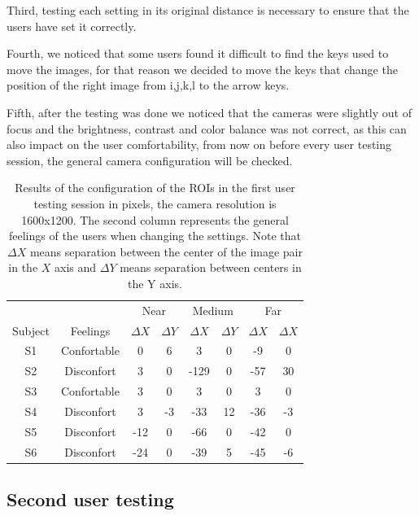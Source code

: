 \documentclass[10pt,a4paper,twocolumn,twoside]{article}
\begin{document}
	Third, testing each setting in its original distance is necessary to ensure that the users have set it correctly.
	
	Fourth, we noticed that some users found it difficult to find the keys used to move the images, for that reason we decided to move the keys that change the position of the right image from i,j,k,l to the arrow keys. 
	
	Fifth, after the testing was done we noticed that the cameras were slightly out of focus and the brightness, contrast and color balance was not correct, as this can also impact on the user comfortability, from now on before every user testing session, the general camera configuration will be checked.
	
	
	\begin{table}
		\begin{center}
			\begin{tabular}{cccccccc}
				\toprule
				& & \multicolumn{2}{c}{Near} & \multicolumn{2}{c}{Medium} & \multicolumn{2}{c}{Far} \\ 
				Subject &Feelings & $\Delta X$ & $\Delta Y$ & $\Delta X$ & $\Delta Y$ & $\Delta X$ & $\Delta X$ \\ 
				\midrule
				S1&Confortable & 0 & 6 & 3 & 0 & -9 & 0 \\ 
				\midrule 
				S2&Disconfort & 3 & 0 & -129 & 0 & -57 & 30 \\ 
				\midrule
				S3&Confortable & 3 & 0 & 3 & 0 & 3 & 0 \\ 
				\midrule 
				S4&Disconfort & 3 & -3 & -33 & 12 & -36 & -3 \\ 
				\midrule
				S5&Disconfort & -12 & 0 & -66 & 0 & -42 & 0 \\ 
				\midrule
				S6&Disconfort & -24 & 0 & -39 & 5 & -45 & -6 \\ 
				\bottomrule
			\end{tabular} 
			\caption{Results of the configuration of the ROIs in the first user testing session in pixels, the camera resolution is 1600x1200. The second column represents the general feelings of the users when changing the settings. Note that $\Delta X$ means separation between the center of the image pair in the $X$ axis and $\Delta Y$ means separation between centers in the Y axis.}
			\label{tab:firstUserTestResults}
		\end{center}
	\end{table}
	
	
	\subsection{Second user testing}
	
\end{document}
